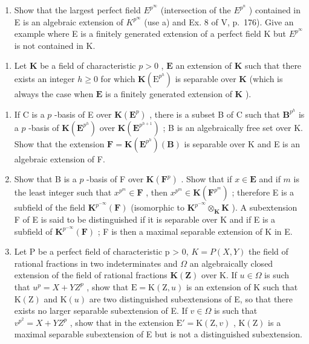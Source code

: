 \begin{enumerate}
\def\labelenumi{\alph{enumi})}
\setcounter{enumi}{1}
\tightlist
\item
  Show that the largest perfect field \(E^{p^{\infty}}\) (intersection of the \(E^{p^{n}}\) ) contained in E is an algebraic extension of \(K^{p^{\infty}}\) (use a) and Ex. 8 of V, p.~176). Give an example where E is a finitely generated extension of a perfect field K but \(E^{p^{\infty}}\) is not contained in K.
\end{enumerate}

\begin{enumerate}
\def\labelenumi{\arabic{enumi})}
\setcounter{enumi}{5}
\tightlist
\item
  Let \(\mathbf{K}\) be a field of characteristic \(p > 0\) , \(\mathbf{E}\) an extension of \(\mathbf{K}\) such that there exists an integer \(h \geqslant 0\) for which \(\mathbf{K}(\mathrm{E}^{p^h})\) is separable over \(\mathbf{K}\) (which is always the case when \(\mathbf{E}\) is a finitely generated extension of \(\mathbf{K}\) ).
\end{enumerate}

\begin{enumerate}
\def\labelenumi{\alph{enumi})}
\item
  If C is a \(p\) -basis of E over \(\mathbf{K}(\mathbf{E}^p)\) , there is a subset B of C such that \(\mathbf{B}^{p^h}\) is a \(p\) -basis of \(\mathbf{K}(\mathbf{E}^{p^h})\) over \(\mathbf{K}(\mathbf{E}^{p^{h+1}})\) ; B is an algebraically free set over K. Show that the extension \(\mathbf{F} = \mathbf{K}(\mathbf{E}^{p^h})(\mathbf{B})\) is separable over K and E is an algebraic extension of F.
\item
  Show that B is a \(p\) -basis of F over \(\mathbf{K}(\mathbf{F}^p)\) . Show that if \(x \in \mathbf{E}\) and if \(m\) is the least integer such that \(x^{p^m} \in \mathbf{F}\) , then \(x^{p^m} \in \mathbf{K}(\mathbf{F}^{p^m})\) ; therefore E is a subfield of the field \(\mathbf{K}^{p^{-\infty}}(\mathbf{F})\) (isomorphic to \(\mathbf{K}^{p^{-\infty}} \otimes_{\mathbf{K}} \mathbf{K}\) ). A subextension F of E is said to be distinguished if it is separable over K and if E is a subfield of \(\mathbf{K}^{p^{-\infty}}(\mathbf{F})\) ; F is then a maximal separable extension of K in E.
\item
  Let P be a perfect field of characteristic p \textgreater{} 0, \(K = P(X, Y)\) the field of rational fractions in two indeterminates and \(\Omega\) an algebraically closed extension of the field of rational fractions \(\mathbf{K}(\mathbf{Z})\) over K. If \(u \in \Omega\) is such that \(u^{p} = X + YZ^{p}\) , show that \(\mathrm{E} = \mathrm{K}(\mathrm{Z}, u)\) is an extension of K such that \(\mathrm{K}(\mathrm{Z})\) and \(\mathrm{K}(u)\) are two distinguished subextensions of E, so that there exists no larger separable subextension of E. If \(v \in \Omega\) is such that \(v^{p^{2}} = X + YZ^{p}\) , show that in the extension \(\mathrm{E}' = \mathrm{K}(\mathrm{Z}, v)\) , \(\mathrm{K}(\mathrm{Z})\) is a maximal separable subextension of E but is not a distinguished subextension.
\end{enumerate}

